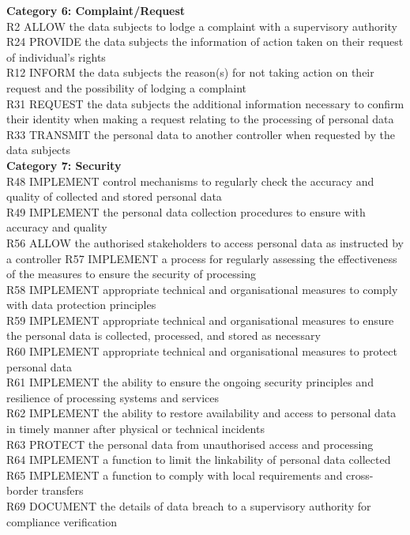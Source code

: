 \noindent \textbf{Category 6: Complaint/Request}\\
R2 ALLOW the data subjects to lodge a complaint with a supervisory authority \\
R24 PROVIDE the data subjects the information of action taken on their request of individual's rights \\
R12 INFORM the data subjects the reason(s) for not taking action on their request and the possibility of lodging a complaint \\
R31 REQUEST the data subjects the additional information necessary to confirm their identity when making a request relating to the processing of personal data \\
R33	TRANSMIT the personal data to another controller when requested by the data subjects \\

\noindent \textbf{Category 7: Security}\\
R48 IMPLEMENT control mechanisms to regularly check the accuracy and quality of collected and stored personal data \\
R49	IMPLEMENT the personal data collection procedures to ensure with accuracy and quality \\
R56 ALLOW the authorised stakeholders to access personal data as instructed by a controller
R57	IMPLEMENT a process for regularly assessing the effectiveness of the measures to ensure the security of processing \\
R58 IMPLEMENT appropriate technical and organisational measures to comply with data protection principles \\
R59 IMPLEMENT appropriate technical and organisational measures to ensure the personal data is collected, processed, and stored as necessary \\
R60 IMPLEMENT appropriate technical and organisational measures to protect personal data \\
R61 IMPLEMENT the ability to ensure the ongoing security principles and resilience of processing systems and services \\
R62 IMPLEMENT the ability to restore availability and access to personal data in timely manner after physical or technical incidents \\
R63 PROTECT the personal data from unauthorised access and processing \\
R64	IMPLEMENT a function to limit the linkability of personal data collected \\
R65 IMPLEMENT a function to comply with local requirements and cross-border transfers \\
R69 DOCUMENT the details of data breach to a supervisory authority for compliance verification \\

